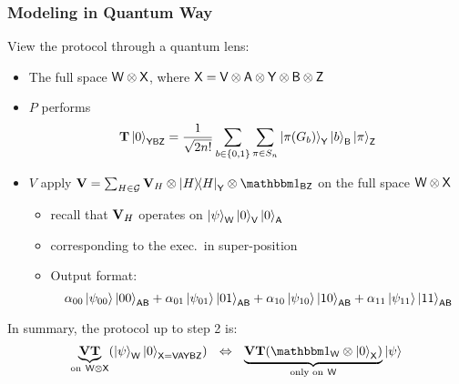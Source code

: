 \documentclass[aspectratio=1610, 12pt, xcolor={dvipsnames}]{beamer}
\begin{document}
\begin{frame}
\frametitle{Modeling in Quantum Way}
View the protocol through a quantum lens: 
\begin{itemize}
	\item
	The full space $\reg{w} \tensor \reg{x}$, where $\reg{x} = \reg{v} \tensor \reg{a} \tensor \reg{y} \tensor \reg{b} \tensor \reg{z}$
\item
$P$ performs $$\vb{T} \ket{0}_\reg{YBZ} = \frac{1}{\sqrt{2\SecPar!}} \sum_{b\in \bits} \sum_{\pi \in S_\SecPar} \ket{\pi(G_b)}_\reg{y} \ket{b}_\reg{B} \ket{\pi}_\reg{z}$$
\item
$V$ apply $\vb{V} = \sum_{H \in \mathcal{G}} \vb{V}_H \tensor \ketbra{H}_\reg{y} \tensor \idm_\reg{bz}$ on the full space $\reg{w}\tensor\reg{x}$
\begin{itemize}
	\item recall that $\vb{V}_H$ operates on $\ket{\psi}_\reg{w} \ket{0}_\reg{v} \ket{0}_\reg{a}$
\item 
corresponding to the exec.\ in super-position
\item
Output format:
$$ \alpha_{00}\ket{\psi_{00}}\ket{00}_\reg{ab} +  \alpha_{01}\ket{\psi_{01}}\ket{01}_\reg{ab} + \alpha_{10}\ket{\psi_{10}}\ket{10}_\reg{ab} +\alpha_{11}\ket{\psi_{11}}\ket{11}_\reg{ab}$$
\end{itemize}
\end{itemize}
In summary, the protocol up to step 2 is:
$$\underbrace{\vb{V}\vb{T}}_{\text{on}~\reg{w}\tensor \reg{x}} (\ket{\psi}_\reg{w} \ket{0}_{\reg{x}= \reg{VAYBZ}}) ~~\Iff~~ \underbrace{\vb{V}\vb{T}(\idm_\reg{w} \tensor \ket{0}_\reg{x})}_{\text{only on}~\reg{w}} \ket{\psi}$$
\end{frame}
\end{document}
